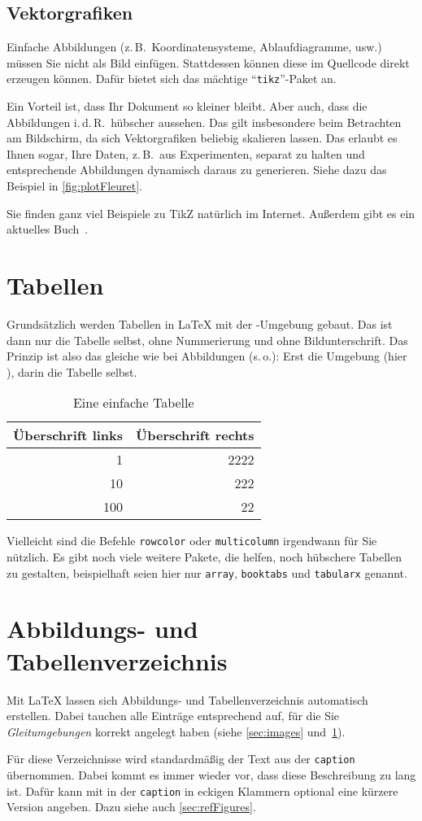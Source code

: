\subsection{Vektorgrafiken}
\label{sec:vectorGraphcis}
%
Einfache Abbildungen (z.\,B.\ Koordinatensysteme, Ablaufdiagramme, usw.) müssen Sie nicht als Bild einfügen. Stattdessen können diese im Quellcode direkt erzeugen können. Dafür bietet sich das mächtige \enquote{\texttt{tikz}}-Paket an.
\par
Ein Vorteil ist, dass Ihr Dokument so kleiner bleibt. Aber auch, dass die Abbildungen i.\,d.\,R.\ hübscher aussehen. Das gilt insbesondere beim Betrachten am Bildschirm, da sich Vektorgrafiken beliebig skalieren lassen.
Das erlaubt es Ihnen sogar, Ihre Daten, z.\,B.\ aus Experimenten, separat zu halten und entsprechende Abbildungen dynamisch daraus zu generieren. Siehe dazu das Beispiel in \cref{fig:plotFleuret}.
\par
Sie finden ganz viel Beispiele zu TikZ natürlich im Internet. Außerdem gibt es ein aktuelles Buch~\cite{kottwitz:tikz}.
%
%
\section{Tabellen}
\label{sec:tables}
Grundsätzlich werden Tabellen in \LaTeX{} mit der -Umgebung gebaut. Das ist dann nur die Tabelle selbst, ohne Nummerierung und ohne Bildunterschrift. Das Prinzip ist also das gleiche wie bei Abbildungen (s.\,o.): Erst die Umgebung (hier ), darin die Tabelle selbst.
%
\begin{table}[tbh]
 \centering
 \begin{tabular}{r|r}
 Überschrift links & Überschrift rechts\\
 \hline
 1   & 2222\\
 10  & 222\\
 100 & 22
 \end{tabular}
 \caption{Eine einfache Tabelle}
 \label{tab:example}
\end{table}
%
Vielleicht sind die Befehle \texttt{rowcolor} oder \texttt{multicolumn} irgendwann für Sie nützlich. Es gibt noch viele weitere Pakete, die helfen, noch hübschere Tabellen zu gestalten, beispielhaft seien hier nur \texttt{array}, \texttt{booktabs} und \texttt{tabularx} genannt.
%
%
\section{Abbildungs- und Tabellenverzeichnis}
\label{sec:captions}
Mit \LaTeX{} lassen sich Abbildungs- und Tabellenverzeichnis automatisch erstellen. Dabei tauchen alle Einträge entsprechend auf, für die Sie \emph{Gleitumgebungen} korrekt angelegt haben (siehe \cref{sec:images} und~\ref{sec:tables}).
\par
Für diese Verzeichnisse wird standardmäßig der Text aus der \texttt{caption} übernommen. Dabei kommt es immer wieder vor, dass diese Beschreibung zu lang ist. Dafür kann mit in der \texttt{caption} in eckigen Klammern optional eine kürzere Version angeben. Dazu siehe auch \cref{sec:refFigures}.
%
%
